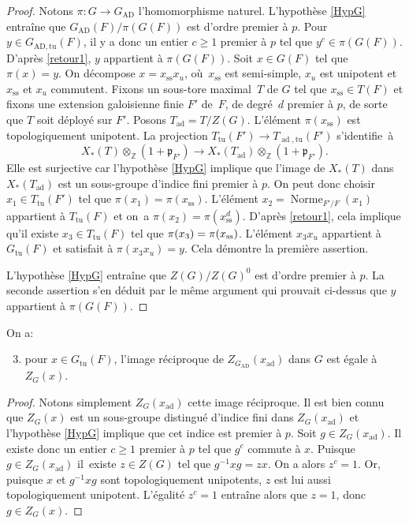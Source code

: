 \documentclass[11pt]{article}
\numberwithin{equation}{section}\providecommand{\og}{«\,}\providecommand{\fg}{\,»}
\newcommand{\frp}{\mathfrak{p}}
\newcommand{\AD}{\mathrm{AD}}
\newcommand{\rss}{\mathrm{ss}}
\newcommand{\tu}{\mathrm{tu}}
\DeclareMathOperator{\ad}{ad}
\DeclareMathOperator{\Norme}{Norme}
\newcommand{\ZZ}{\mathbb{Z}}
\theoremstyle{plain}
\theoremstyle{definition}
\begin{document}
\begin{proof}
Notons $\pi:G\to G_{\AD}$ l'homomorphisme naturel. L'hypothèse \ref{HypG} entraîne que $G_{\AD}(F)/\pi(G(F))$ est d'ordre premier à $p$. Pour $y\in G_{\AD,\tu}(F)$, il y a donc un entier $c\geq1$ premier à $p$ tel que $y^c\in \pi(G(F))$. D'après \eqref{retour1}, $y$ appartient à $\pi(G(F))$. Soit $x\in G(F)$ tel que $\pi(x)=y$. On décompose $x=x_{\rss}x_{u}$, où~$x_{\rss}$ est semi-simple, $x_{u}$ est unipotent et $x_{\rss}$ et $x_{u}$ commutent. Fixons un sous-tore maximal~$T$ de $G$ tel que $x_{\rss}\in T(F)$ et fixons une extension galoisienne finie $F'$ de~$F$, de degré~$d$ premier à $p$, de sorte que $T$ soit déployé sur $F'$. Posons $T_{\ad}=T/Z(G)$. L'élément $\pi(x_{\rss})$ est topologiquement unipotent. La projection $T_{\tu}(F')\to T_{\ad,\tu}(F')$ s'identifie~à
\[
X_{*}(T)\otimes_{\ZZ}(1+\frp_{F'})\to X_{*}(T_{\ad})\otimes_{\ZZ}(1+\frp_{F'}).
\]
Elle est surjective car l'hypothèse \ref{HypG} implique que l'image de $X_{*}(T)$ dans $X_{*}(T_{\ad})$ est un sous-groupe d'indice fini premier à $p$.
On peut donc choisir \hbox{$x_{1}\!\in\!T_{\tu}(F')$} tel que $\pi(x_{1})=\pi(x_{\rss})$. L'élément $x_{2}=\Norme_{F'/F}(x_{1})$ appartient à $T_{\tu}(F)$ et on~a $\pi(x_{2})=\pi(x_{\rss}^d)$. D'après \eqref{retour1}, cela implique qu'il existe $x_{3}\in T_{\tu}(F)$ tel que $\pi(x_{3})=\nobreak\pi(x_{\rss})$. L'élément $x_{3}x_{u}$ appartient à $G_{\tu}(F)$ et satisfait à $\pi(x_{3}x_{u})=y$. Cela démontre la première assertion.

L'hypothèse \ref{HypG} entraîne que $Z(G)/Z(G)^0$ est d'ordre premier à $p$. La seconde assertion s'en déduit par le même argument qui prouvait ci-dessus que $y$ appartient à $\pi(G(F))$.
\end{proof}

On a:
\begin{enumerate}\setcounter{enumi}{2}
\item\label{retour3}
pour $x\in G_{\tu}(F)$, l'image réciproque de $Z_{G_{\AD}}(x_{\ad})$ dans $G$ est égale à $Z_{G}(x)$.
\end{enumerate}

\begin{proof}
Notons simplement $Z_{G}(x_{\ad})$ cette image réciproque. Il est bien connu que $Z_{G}(x)$ est un sous-groupe distingué d'indice fini dans $Z_{G}(x_{\ad})$ et l'hypothèse \ref{HypG} implique que cet indice est premier à $p$. Soit $g\in Z_{G}(x_{\ad})$. Il existe donc un entier $c\geq1$ premier à $p$ tel que $g^c$ commute à $x$. Puisque $g\in Z_{G}(x_{\ad})$ il~existe $z\in Z(G)$ tel que $ g^{-1}xg=zx$. On a alors $z^c=1$. Or, puisque $x$ et $g^{-1}xg$ sont topologiquement unipotents, $z$ est lui aussi topologiquement unipotent. L'égalité $z^c=1$ entraîne alors que $z=1$, donc $g\in Z_{G}(x)$.
\end{proof}
\end{document}
